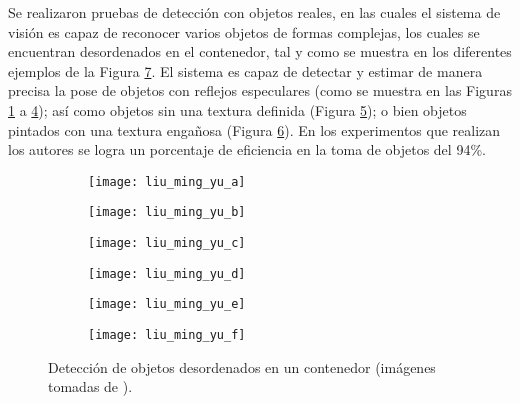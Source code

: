 Se realizaron pruebas de detección con objetos reales, en las cuales el sistema de visión es capaz de reconocer varios objetos de formas complejas, los cuales se encuentran desordenados en el contenedor, tal y como se muestra en los diferentes ejemplos de la Figura \ref{fig:doi:10.1177/0278364911436018}.
El sistema es capaz de detectar y estimar de manera precisa la pose de objetos con reflejos especulares (como se muestra en las Figuras \ref{subfig:bin_picking_a} a \ref{subfig:bin_picking_d}); así como objetos sin una textura definida (Figura \ref{subfig:bin_picking_e}); o bien objetos pintados con una textura engañosa (Figura \ref{subfig:bin_picking_f}).
En los experimentos que realizan los autores se logra un porcentaje de eficiencia en la toma de objetos del 94\!\%.
%
\begin{figure}[H]
	\def\hsep{4pt}%
	\begin{subfigure}{0.32\linewidth}
		\texttt{[image: liu\_ming\_yu\_a]}%
		\subcaption{}%
		\label{subfig:bin_picking_a}%
	\end{subfigure}%
	\hspace{\hsep}%
	\begin{subfigure}{0.32\linewidth}
		\texttt{[image: liu\_ming\_yu\_b]}%
		\subcaption{}%
		\label{subfig:bin_picking_b}%
	\end{subfigure}%
	\hspace{\hsep}%
	\begin{subfigure}{0.32\linewidth}
		\texttt{[image: liu\_ming\_yu\_c]}%
		\subcaption{}%
		\label{subfig:bin_picking_c}%
	\end{subfigure}%
	
	\vspace{3pt}
	
	\begin{subfigure}{0.32\linewidth}
		\texttt{[image: liu\_ming\_yu\_d]}%
		\subcaption{}%
		\label{subfig:bin_picking_d}%
	\end{subfigure}%
	\hspace{\hsep}%
	\begin{subfigure}{0.32\linewidth}
		\texttt{[image: liu\_ming\_yu\_e]}%
		\subcaption{}%
		\label{subfig:bin_picking_e}%
	\end{subfigure}%
	\hspace{\hsep}%
	\begin{subfigure}{0.32\linewidth}
		\texttt{[image: liu\_ming\_yu\_f]}%
		\subcaption{}%
		\label{subfig:bin_picking_f}%
	\end{subfigure}%
	\caption{Detección de objetos desordenados en un contenedor (imágenes tomadas de \cite{doi:10.1177/0278364911436018}).}%
	\label{fig:doi:10.1177/0278364911436018}%
\end{figure}%
